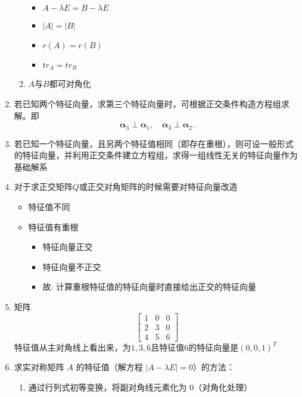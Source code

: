 \documentclass[a4paper,12pt]{article}
\begin{document}
\begin{enumerate}
\begin{enumerate}
\begin{itemize}
                \item $A - \lambda E = B - \lambda E$
                \item $|A| = |B|$
                \item $r(A) = r(B)$
                \item $tr_A = tr_B$
            \end{itemize}
            \item $A$与$B$都可对角化
        \end{enumerate}
        \item 若已知两个特征向量，求第三个特征向量时，可根据正交条件构造方程组求解。即
        \[
            \bm{\alpha}_3 \perp \bm{\alpha}_1, \quad
            \bm{\alpha}_3 \perp \bm{\alpha}_2.
        \]
        \item 若已知一个特征向量，且另两个特征值相同（即存在重根），则可设一般形式的特征向量，并利用正交条件建立方程组，求得一组线性无关的特征向量作为基础解系
        \item 对于{\color[rgb]{0.2, 0.6, 0.3}{实对称矩阵$A$}}求正交矩阵$Q$或正交对角矩阵的时候需要对特征向量改造
        \begin{itemize}
            \item 特征值不同 \Rightarrow {}
            \item 特征值有重根
            \begin{itemize}
                \item 特征向量正交 \Rightarrow {}
                \item 特征向量不正交 \Rightarrow {}
                \item 故: 计算重根特征值的特征向量时直接给出正交的特征向量
            \end{itemize}
        \end{itemize}
        \item 矩阵
        \[
            \begin{bmatrix}
                1 & 0 & 0 \\
                2 & 3 & 0 \\
                4 & 5 & 6
            \end{bmatrix}
        \]特征值从主对角线上看出来，为$1, 3, 6$且特征值6的特征向量是$(0, 0, 1)^T$
        \item 求实对称矩阵 $A$ 的特征值（解方程 $|A - \lambda E| = 0$）的方法：
        \begin{enumerate}
            \item 通过行列式初等变换，将副对角线元素化为 0（对角化处理）

\end{enumerate}
\end{enumerate}
\end{document}
